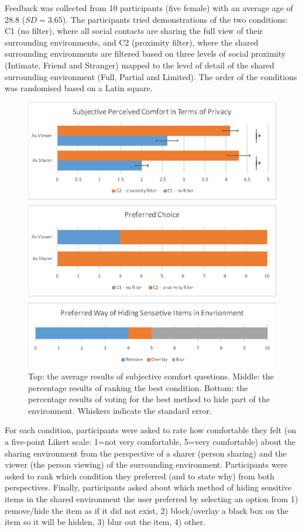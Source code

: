 Feedback was collected from 10 participants (five female) with an average age of 28.8 ($SD=3.65$). The participants tried demonstrations of the two conditions: C1 (no filter), where all social contacts are sharing the full view of their surrounding environments, and C2 (proximity filter), where the shared surrounding environments are filtered based on three levels of social proximity (Intimate, Friend and Stranger) mapped to the level of detail of the shared surrounding environment (Full, Partial and Limited). The order of the conditions was randomised based on a Latin square. 

\begin{figure}[H]
  \centering
  \includegraphics[width=.6\linewidth]{images/ismar18/images-04.eps}
  \caption{Top: the average results of subjective comfort questions. Middle: the percentage results of ranking the best condition. Bottom: the percentage results of voting for the best method to hide part of the environment. Whiskers indicate the standard error.}
  \label{fig:environment:results}
\end{figure}


For each condition, participants were asked to rate how comfortable they felt (on a five-point Likert scale: 1=not very comfortable, 5=very comfortable) about the sharing environment from the perspective of a sharer (person sharing) and the viewer (the person viewing) of the surrounding environment. Participants were asked to rank which condition they preferred (and to state why) from both perspectives. Finally, participants asked about which method of hiding sensitive items in the shared environment the user preferred by selecting an option from 1) remove/hide the item as if it did not exist, 2) block/overlay a black box on the item so it will be hidden, 3) blur out the item, 4) other. 

